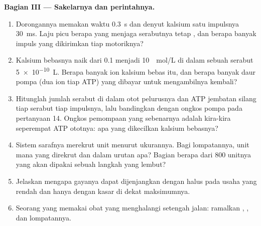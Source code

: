 \begin{problem}
\medskip
\noindent\textbf{Bagian III --- Sakelarnya dan perintahnya.}
\begin{enumerate}[resume]
  \item Dorongannya memakan waktu \qty{0.3}{s} dan denyut kalsium satu
        impulsnya \qty{30}{ms}. Laju picu berapa yang menjaga serabutnya
        tetap , dan berapa banyak impuls yang dikirimkan tiap
         motoriknya?
  \item Kalsium bebasnya naik dari \qty{0.1}{} menjadi \qty{10}{\micro
        mol/L} di dalam sebuah serabut \qty{5e-10}{L}. Berapa banyak ion
        kalsium bebas itu, dan berapa banyak daur pompa (dua ion tiap
        ATP) yang dibayar untuk mengambilnya kembali?
  \item Hitunglah jumlah serabut di dalam otot pelurusnya dan ATP
        jembatan silang tiap serabut tiap impulsnya, lalu bandingkan
        dengan ongkos pompa pada pertanyaan 14. Ongkos pemompaan yang
        sebenarnya adalah kira-kira seperempat ATP ototnya: apa yang
        dikecilkan kalsium bebasnya?
  \item Sistem sarafnya merekrut unit menurut ukurannya. Bagi
        lompatannya, unit mana yang direkrut dan dalam urutan apa?
        Bagian berapa dari \num{800} unitnya yang akan dipakai sebuah
        langkah yang lembut?
  \item Jelaskan mengapa gayanya dapat dijenjangkan dengan halus pada
        usaha yang rendah dan hanya dengan kasar di dekat maksimumnya.
  \item Seorang yang memakai obat yang menghalangi  setengah jalan: ramalkan , ,
        dan lompatannya.
\end{enumerate}


\end{problem}
